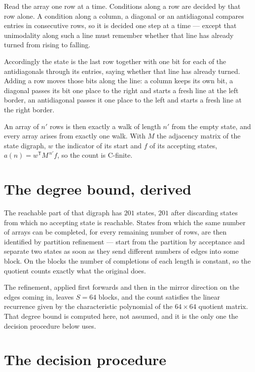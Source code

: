 \documentclass[11pt]{article}
\theoremstyle{definition}
\begin{document}
Read the array one row at a time. Conditions along a row are decided by that row alone. A condition along a column, a diagonal or an antidiagonal compares entries in consecutive rows, so it is decided one step at a time --- except that unimodality along such a line must remember whether that line has already turned from rising to falling.

Accordingly the state is the last row together with one bit for each of the antidiagonals through its entries, saying whether that line has already turned. Adding a row moves those bits along the line: a column keeps its own bit, a diagonal passes its bit one place to the right and starts a fresh line at the left border, an antidiagonal passes it one place to the left and starts a fresh line at the right border.

An array of $n'$ rows is then exactly a walk of length $n'$ from the empty state, and every array arises from exactly one walk. With $M$ the adjacency matrix of the state digraph, $w$ the indicator of its start and $f$ of its accepting states, $a(n) = w^{\mathsf T}M^{\,n'}f$, so the count is C-finite.

\section{The degree bound, derived}

The reachable part of that digraph has $201$ states, $201$ after discarding states from which no accepting state is reachable. States from which the same number of arrays can be completed, for every remaining number of rows, are then identified by partition refinement --- start from the partition by acceptance and separate two states as soon as they send different numbers of edges into some block. On the blocks the number of completions of each length is constant, so the quotient counts exactly what the original does.

The refinement, applied first forwards and then in the mirror direction on the edges coming in, leaves $S = 64$ blocks, and the count satisfies the linear recurrence given by the characteristic polynomial of the $64 \times 64$ quotient matrix. That degree bound is computed here, not assumed, and it is the only one the decision procedure below uses.

\section{The decision procedure}
\end{document}
